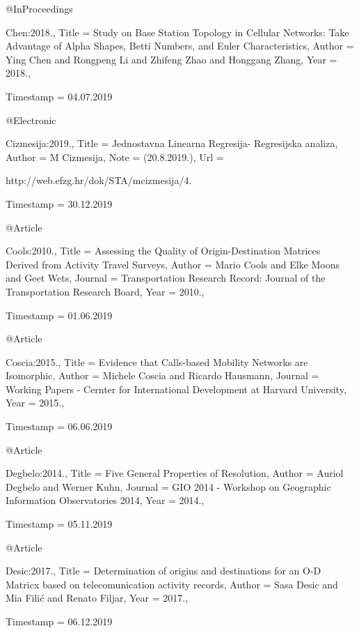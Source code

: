 @InProceedings{Chen:2018.,
  Title                    = {{Study on Base Station Topology in Cellular Networks: Take Advantage of Alpha Shapes, Betti Numbers, and Euler Characteristics}},
  Author                   = {Ying Chen and Rongpeng Li and Zhifeng Zhao and Honggang Zhang},
  Year                     = {2018.},

  Timestamp                = {04.07.2019}
}

@Electronic{Cizmesija:2019.,
  Title                    = {{Jednostavna Linearna Regresija- Regresijska analiza}},
  Author                   = {M Cizmesija},
  Note                     = {(20.8.2019.)},
  Url                      = {http://web.efzg.hr/dok/STA/mcizmesija/4.%

  Timestamp                = {30.12.2019}
}

@Article{Cools:2010.,
  Title                    = {{Assessing the Quality of Origin-Destination Matrices Derived from Activity Travel Surveys}},
  Author                   = {Mario Cools and Elke Moons and Geet Wets},
  Journal                  = {Transportation Research Record: Journal of the Transportation Research Board},
  Year                     = {2010.},

  Timestamp                = {01.06.2019}
}

@Article{Coscia:2015.,
  Title                    = {{Evidence that Calls-based Mobility Networks are Isomorphic}},
  Author                   = {Michele Coscia and Ricardo Hausmann},
  Journal                  = {Working Papers - Cernter for International Development at Harvard University},
  Year                     = {2015.},

  Timestamp                = {06.06.2019}
}

@Article{Degbelo:2014.,
  Title                    = {Five General Properties of Resolution},
  Author                   = {Auriol Degbelo and Werner Kuhn},
  Journal                  = {GIO 2014 - Workshop on Geographic Information Observatories 2014},
  Year                     = {2014.},

  Timestamp                = {05.11.2019}
}

@Article{Desic:2017.,
  Title                    = {{Determination of origins and destinations for an O-D Matricx based on telecomunication activity records}},
  Author                   = {Sasa Desic and Mia Fili\'c and Renato Filjar},
  Year                     = {2017.},

  Timestamp                = {06.12.2019}
}

}
